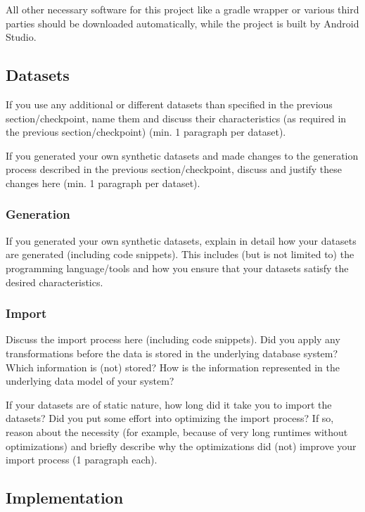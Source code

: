 All other necessary software for this project like a gradle wrapper or various third parties should be downloaded automatically, while the project is built by Android Studio.


\subsection{Datasets}

If you use any additional or different datasets than specified in the previous
section/checkpoint, name them and discuss their characteristics (as required in
the previous section/checkpoint) (min. 1 paragraph per dataset).

If you generated your own synthetic datasets and made changes to the generation
process described in the previous section/checkpoint, discuss and justify these
changes here (min. 1 paragraph per dataset).

\subsubsection{Generation}

If you generated your own synthetic datasets, explain in detail how your
datasets are generated (including code snippets). This includes (but is not
limited to) the programming language/tools and how you ensure that your datasets
satisfy the desired characteristics.

\subsubsection{Import}

Discuss the import process here (including code snippets). Did you apply any
transformations before the data is stored in the underlying database system?
Which information is (not) stored? How is the information represented in the
underlying data model of your system?

If your datasets are of static nature, how long did it take you to import the
datasets? Did you put some effort into optimizing the import process? If so,
reason about the necessity (for example, because of very long runtimes without
optimizations) and briefly describe why the optimizations did (not) improve your
import process (1 paragraph each).

\subsection{Implementation}


